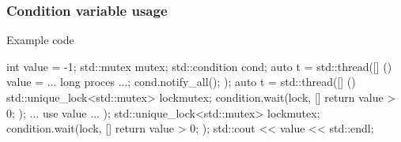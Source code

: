 \begin{frame}[fragile]
  \frametitle{Condition variable usage}
  \begin{exampleblock}{Example code}
    \begin{cppcode*}{}
      int value = -1;
      std::mutex mutex;
      std::condition cond;
      auto t = std::thread([] () {
        value = ... long proces ...;
        cond.notify_all();
      });
      auto t = std::thread([] () {
        std::unique_lock<std::mutex> lock{mutex};
        condition.wait(lock, [] { return value > 0; });
        ... use value ...
      });
      { std::unique_lock<std::mutex> lock{mutex};
        condition.wait(lock, [] { return value > 0; });
        std::cout << value << std::endl; }
    \end{cppcode*}
  \end{exampleblock}
\end{frame}
